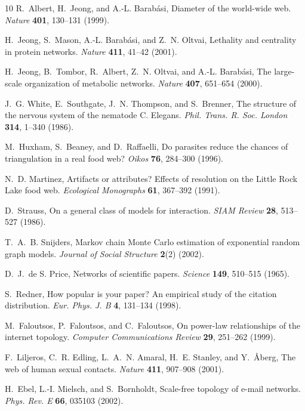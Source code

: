\documentclass[twocolumn,pre]{revtex4}
\begin{document}
\begin{thebibliography}{10}
R.~Albert, H.~Jeong, and A.-L. Barab\'asi, Diameter of the world-wide web.
  \textit{Nature} \textbf{401}, 130--131 (1999).

H.~Jeong, S.~Mason, A.-L. Barab\'asi, and Z.~N. Oltvai, Lethality and
  centrality in protein networks. \textit{Nature} \textbf{411}, 41--42 (2001).

H.~Jeong, B.~Tombor, R.~Albert, Z.~N. Oltvai, and A.-L. Barab\'asi, The
  large-scale organization of metabolic networks. \textit{Nature} \textbf{407},
  651--654 (2000).

J.~G. White, E.~Southgate, J.~N. Thompson, and S.~Brenner, The structure of the
  nervous system of the nematode {C.} {E}legans. \textit{Phil. Trans. R. Soc.
  London} \textbf{314}, 1--340 (1986).

M.~Huxham, S.~Beaney, and D.~Raffaelli, Do parasites reduce the chances of
  triangulation in a real food web? \textit{Oikos} \textbf{76}, 284--300
  (1996).

N.~D. Martinez, Artifacts or attributes? {E}ffects of resolution on the
  {L}ittle {R}ock {L}ake food web. \textit{Ecological Monographs} \textbf{61},
  367--392 (1991).

D.~Strauss, On a general class of models for interaction. \textit{SIAM Review}
  \textbf{28}, 513--527 (1986).

T.~A.~B. Snijders, {M}arkov chain {M}onte {C}arlo estimation of exponential
  random graph models. \textit{Journal of Social Structure} \textbf{2}(2)
  (2002).

D.~J.~{\relax de S}. Price, Networks of scientific papers. \textit{Science}
  \textbf{149}, 510--515 (1965).

S.~Redner, How popular is your paper? {A}n empirical study of the citation
  distribution. \textit{Eur. Phys. J. B} \textbf{4}, 131--134 (1998).

M.~Faloutsos, P.~Faloutsos, and C.~Faloutsos, On power-law relationships of the
  internet topology. \textit{Computer Communications Review} \textbf{29},
  251--262 (1999).

F.~Liljeros, C.~R. Edling, L.~A.~N. Amaral, H.~E. Stanley, and Y.~\AA{}berg,
  The web of human sexual contacts. \textit{Nature} \textbf{411}, 907--908
  (2001).

H.~Ebel, L.-I. Mielsch, and S.~Bornholdt, Scale-free topology of e-mail
  networks. \textit{Phys. Rev. E} \textbf{66}, 035103 (2002).


\end{thebibliography}
\end{document}
